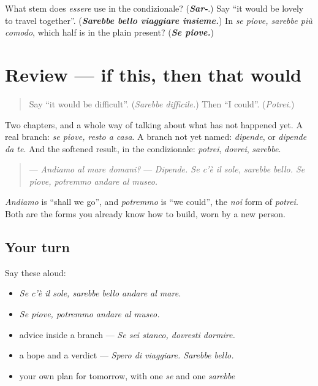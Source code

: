 \begin{tcolorbox}[breakable,colback=teal!4,colframe=teal!35!black,title={Before you move on}]
What stem does \emph{essere} use in the condizionale? (\emph{\textbf{Sar-}}.) Say \textquotedblleft{}it would be lovely to travel together\textquotedblright{}. (\emph{\textbf{Sarebbe bello viaggiare insieme.}}) In \emph{se piove, sarebbe più comodo}, which half is in the plain present? (\emph{\textbf{Se piove.}})
\end{tcolorbox}
\section[(review)]{Review — if this, then that would}

\label{lesson:IT-C272-ripasso-condizionale}



\begin{quote}
Say \textquotedblleft{}it would be difficult\textquotedblright{}. (\emph{Sarebbe difficile.}) Then \textquotedblleft{}I could\textquotedblright{}. (\emph{Potrei.})
\end{quote}

\begin{grammarlens}[title={What you've built}]
Two chapters, and a whole way of talking about what has not happened yet. A real branch: \emph{se piove, resto a casa}. A branch not yet named: \emph{dipende}, or \emph{dipende da te}. And the softened result, in the condizionale: \emph{potrei}, \emph{dovrei}, \emph{sarebbe}.

\begin{quote}
— \emph{Andiamo al mare domani?} — \emph{Dipende. Se c'è il sole, sarebbe bello. Se piove, potremmo andare al museo.}
\end{quote}

\emph{Andiamo} is \textquotedblleft{}shall we go\textquotedblright{}, and \emph{potremmo} is \textquotedblleft{}we could\textquotedblright{}, the \emph{noi} form of \emph{potrei}. Both are the forms you already know how to build, worn by a new person.
\end{grammarlens}

\subsection*{Your turn}
Say these aloud:

\begin{itemize}
\raggedright
  \item \emph{Se c'è il sole, sarebbe bello andare al mare.}
  \item \emph{Se piove, potremmo andare al museo.}
  \item advice inside a branch — \emph{Se sei stanco, dovresti dormire.}
  \item a hope and a verdict — \emph{Spero di viaggiare. Sarebbe bello.}
  \item your own plan for tomorrow, with one \emph{se} and one \emph{sarebbe}
\end{itemize}


